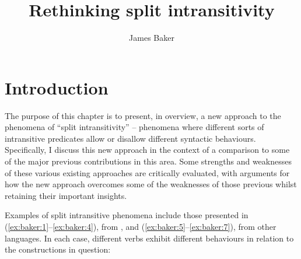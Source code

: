 \documentclass[output=paper]{langsci/langscibook}
\author{James Baker\affiliation{University of Cambridge}}
\title{Rethinking split intransitivity}
\begin{document}
\glsresetall

\section{Introduction}

The purpose of this chapter is to present, in overview, a new approach to the
phenomena of \enquote{split intransitivity} – phenomena where different sorts
of intransitive predicates allow or disallow different syntactic behaviours.
Specifically, I discuss this new approach in the context of a comparison to
some of the major previous contributions in this area. Some strengths and
weaknesses of these various existing approaches are critically evaluated, with
arguments for how the new approach overcomes some of the weaknesses of those
previous whilst retaining their important insights.

Examples of split intransitive phenomena include those presented in (\ref{ex:baker:1}--\ref{ex:baker:4}),
from , and (\ref{ex:baker:5}--\ref{ex:baker:7}), from other languages. In each case, different verbs
exhibit different behaviours in relation to the constructions in question:
\end{document}
